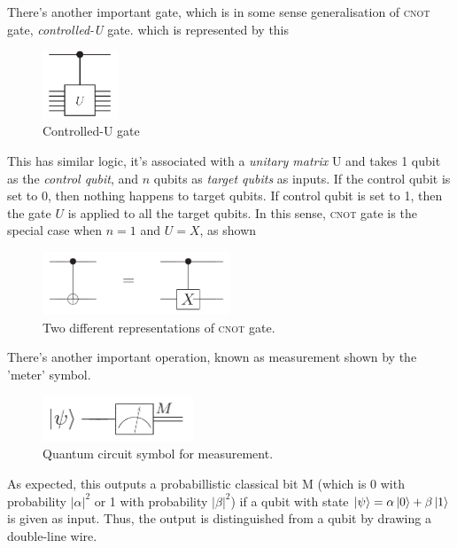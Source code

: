 There's another important gate, which is in some sense generalisation of \textsc{cnot} gate, \textit{controlled-U} gate. which is represented by this
\begin{figure}[H]
    \centering
    \includegraphics[width=0.2\textwidth]{images/controlled_u.png}
    \caption{Controlled-U gate}
    \label{fig:controlled-u}
\end{figure}
This has similar logic, it's associated with a \textit{unitary matrix} U and takes 1 qubit as the \textit{control qubit}, and $n$ qubits as \textit{target qubits} as inputs. If the control qubit is set to 0, then nothing happens to target qubits. If control qubit is set to 1, then the gate $U$ is applied to all the target qubits. In this sense, \textsc{cnot} gate is the special case when $n=1$ and $U=X$, as shown
\begin{figure}[H]
    \centering
    \includegraphics[width=0.5\textwidth]{images/cnot_as_cu.png}
    \caption{Two different representations of \textsc{cnot} gate.}
    \label{fig:cnot-as-cu}
\end{figure}

There's another important operation, known as measurement shown by the 'meter' symbol.
\begin{figure}[H]
    \centering
    \includegraphics[width=0.4\textwidth]{images/measurement.png}
    \caption{Quantum circuit symbol for measurement.}
    \label{fig:measurement}
\end{figure}
As expected, this outputs a probabillistic classical bit M (which is 0 with probability $|\alpha|^2$ or 1 with probability $|\beta|^2$) if a qubit with state $\ket{\psi} = \alpha\ket{0} + \beta\ket{1}$ is given as input. Thus, the output is distinguished from a qubit by drawing a double-line wire.

